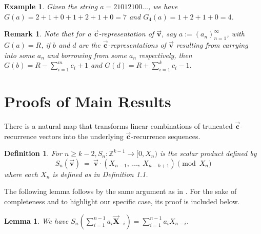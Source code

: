 \documentclass[]{interact}
\newcommand{\vtr}[1]{\vec{\mathbf{#1}}}
\theoremstyle{plain}
\numberwithin{equation}{section} %
\newtheorem{lemma}[thm]{Lemma}
\newtheorem{example}[thm]{Example}
\newtheorem{definition}[thm]{Definition}
\newtheorem{remark}[thm]{Remark}
\numberwithin{table}{section} %
\numberwithin{figure}{section}
\begin{document}
\begin{example}{\label{Ex: Sum of ceof}}
    Given the string $a=21012100 \dots$, we have $G(a)=2+1+0+1+2+1+0=7$ and $G_4(a)=1+2+1+0=4$.
\end{example}
\begin{remark}\label{Rem:sumofcoefs bor/car}
    Note that for a $\vtr{c}$-representation of $\vtr{v}$, say $a:=(a_n)_{n=1}^\infty$, with $G(a)=R$, if $b$ and $d$ are the $\vtr{c}$-representations of $\vtr{v}$ resulting from carrying into some $a_n$ and borrowing from some $a_n$ respectively, then $G(b)=R - \sum_{i=1}^m c_i + 1$ and $G(d)=R + \sum_{i=1}^kc_i -1$.
\end{remark}

\section{Proofs of Main Results}

There is a natural map that transforms linear combinations of truncated $\vtr{c}$-recurrence vectors into the underlying $\vtr{c}$-recurrence sequences. 

\begin{definition}\label{def:Sn}
    For $n\geq k-2,S_n:\mathbb{Z}^{k-1}\xrightarrow{}[0,X_n)$ is the scalar product defined by
    \[S_n(\vtr{v})\ =\ \vtr{v}\cdot(X_{n-1},\ \ldots,\ X_{n-k+1})\pmod{X_n}\]
    where each $X_n$ is defined as in Definition 1.1.
\end{definition}



The following lemma follows by the same argument as in \textcolor{blue}{\cite{ABJ11}}. For the sake of completeness and to highlight our specific case, its proof is included below.

\begin{lemma}
\label{lem:S_n}
  We have  $S_n(\sum_{i=1}^{n-1}a_i\vtr{X}_{-i}) = \sum _{i=1}^{n-1}a_iX_{n-i}$.
\end{lemma}
\end{document}
